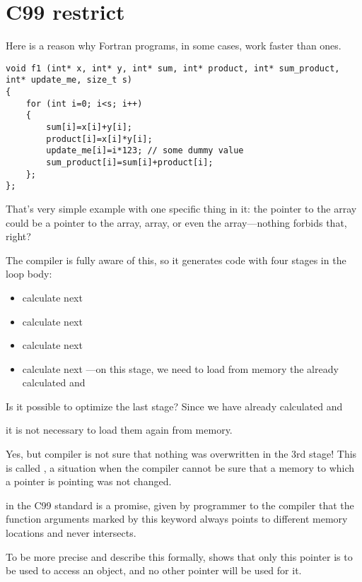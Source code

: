 \section{C99 restrict}

Here is a reason why Fortran programs, in some cases, work faster than \CCpp ones.

\begin{lstlisting}
void f1 (int* x, int* y, int* sum, int* product, int* sum_product, int* update_me, size_t s)
{
	for (int i=0; i<s; i++)
	{
		sum[i]=x[i]+y[i];
		product[i]=x[i]*y[i];
		update_me[i]=i*123; // some dummy value
		sum_product[i]=sum[i]+product[i];	
	};
};
\end{lstlisting}

That's very simple example with one specific
thing in it: 
the pointer to the  array could be
a pointer to the
 array,  array, or even the 
 array---nothing forbids that, right?

The compiler is fully aware of this, so it generates code with four stages in the loop body:
\begin{itemize}
\item calculate next 
\item calculate next 
\item calculate next 
\item calculate next ---on this stage, we need to load from memory
the already calculated  and 
\end{itemize}

Is it possible to optimize the last stage?
Since we have already calculated  and  

it is not necessary to load them again from memory.

Yes, but compiler is not sure that nothing was overwritten in the 3rd stage!
This is called , 
a situation when the compiler cannot be sure that a memory to which a pointer is pointing was not changed.

 in the C99 standard 
is a promise, given by programmer to the compiler that the function arguments 
marked by this keyword always points to different memory locations and never intersects.

To be more precise and describe this formally,  shows that only this pointer is to be used
to access an object, and no other pointer will be used for it.


